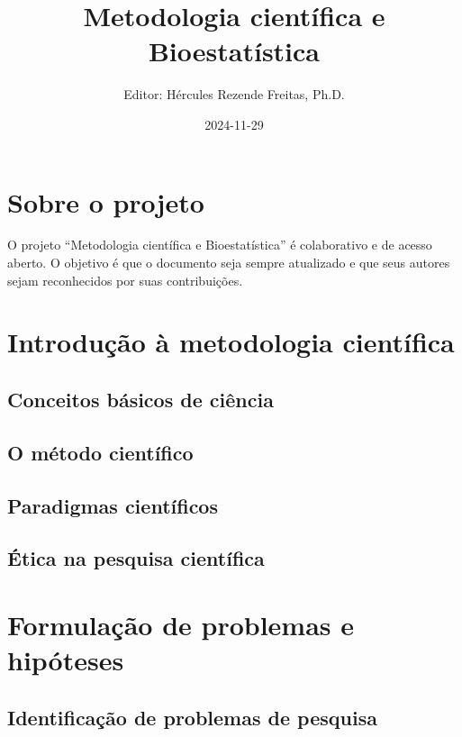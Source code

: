\documentclass[
]{book}
\title{Metodologia científica e Bioestatística}
\author{Editor: Hércules Rezende Freitas, Ph.D.}
\date{2024-11-29}
\begin{document}
\maketitle

{
\setcounter{tocdepth}{1}
\tableofcontents
}
\chapter{Sobre o projeto}\label{sobre-o-projeto}

O projeto ``Metodologia científica e Bioestatística'' é colaborativo e de acesso aberto. O objetivo é que o documento seja sempre atualizado e que seus autores sejam reconhecidos por suas contribuições.

\chapter{Introdução à metodologia científica}\label{introduuxe7uxe3o-uxe0-metodologia-cientuxedfica}

\section{Conceitos básicos de ciência}\label{conceitos-buxe1sicos-de-ciuxeancia}

\section{O método científico}\label{o-muxe9todo-cientuxedfico}

\section{Paradigmas científicos}\label{paradigmas-cientuxedficos}

\section{Ética na pesquisa científica}\label{uxe9tica-na-pesquisa-cientuxedfica}

\chapter{Formulação de problemas e hipóteses}\label{formulauxe7uxe3o-de-problemas-e-hipuxf3teses}

\section{Identificação de problemas de pesquisa}\label{identificauxe7uxe3o-de-problemas-de-pesquisa}
\end{document}
